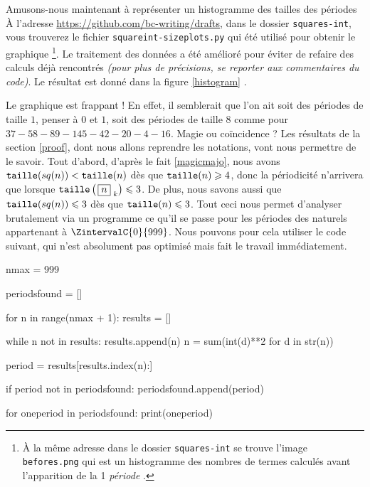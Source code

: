 \medskip

Amusons-nous maintenant à représenter un histogramme des tailles des \og périodes \fg{}
À l'adresse \url{https://github.com/bc-writing/drafts}, dans le dossier \texttt{squares-int}, vous trouverez le fichier \texttt{squareint-sizeplots.py} qui été utilisé pour obtenir le graphique
\footnote{
	À la même adresse dans le dossier \texttt{squares-int} se trouve l'image \texttt{befores.png} qui est un histogramme des nombres de termes calculés avant l'apparition de la 1\iere{} \emph{\og période \fg{}}.
}.
Le traitement des données a été amélioré pour éviter de refaire des calculs déjà rencontrés \emph{(pour plus de précisions, se reporter aux commentaires du code)}.
Le résultat est donné dans la figure \ref{histogram} .



\medskip

Le graphique est frappant ! En effet, il semblerait que l'on ait soit des périodes de taille $1$, penser à $0$ et $1$, soit des périodes de taille $8$ comme pour $37 - 58 - 89 - 145 - 42 - 20 - 4 - 16$.
Magie ou coïncidence ? Les résultats de la section \ref{proof}, dont nous allons reprendre les notations, vont nous permettre de le savoir.
Tout d'abord,  d'après le fait \ref{magicmajo}, nous avons $\operatorname{\text{\normalfont\texttt{taille}}}(sq(n)) < \operatorname{\text{\normalfont\texttt{taille}}}(n)$ dès que $\operatorname{\text{\normalfont\texttt{taille}}}(n) \geqslant 4$, donc la périodicité n'arrivera que lorsque $\operatorname{\text{\normalfont\texttt{taille}}}\left( \, \fbox{$n$}_{\,\,k} \right) \leqslant 3$.
De plus, nous savons aussi que $\operatorname{\text{\normalfont\texttt{taille}}}(sq(n)) \leqslant 3$ dès que $\operatorname{\text{\normalfont\texttt{taille}}}(n) \leqslant 3$.
Tout ceci nous permet d'analyser brutalement via un programme ce qu'il se passe pour les périodes des naturels appartenant à $\ZintervalC{0}{999}$. Nous pouvons pour cela utiliser le code suivant, qui n'est absolument pas optimisé mais fait le travail immédiatement.


\newpage

\begin{rawcode}
nmax = 999

periodsfound = []

for n in range(nmax + 1):
    results = []

    while n not in results:
        results.append(n)
        n = sum(int(d)**2 for d in str(n))

    period = results[results.index(n):]

    if period not in periodsfound:
        periodsfound.append(period)

for oneperiod in periodsfound:
    print(oneperiod)
\end{rawcode}



